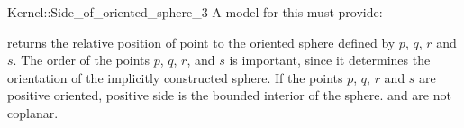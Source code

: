 \begin{ccRefFunctionObjectConcept}{Kernel::Side_of_oriented_sphere_3}
A model for this must provide:


         {returns the relative position of point 
          to the oriented sphere defined by $p$, $q$, $r$ and $s$.
          The order of the points $p$, $q$, $r$, and $s$ is important,
          since it determines the orientation of the implicitly
          constructed sphere. If the points $p$, $q$, $r$ and $s$
          are positive oriented, positive side is the bounded interior
          of the sphere.
          \ccPrecond {} and  are not coplanar.}

\end{ccRefFunctionObjectConcept}
